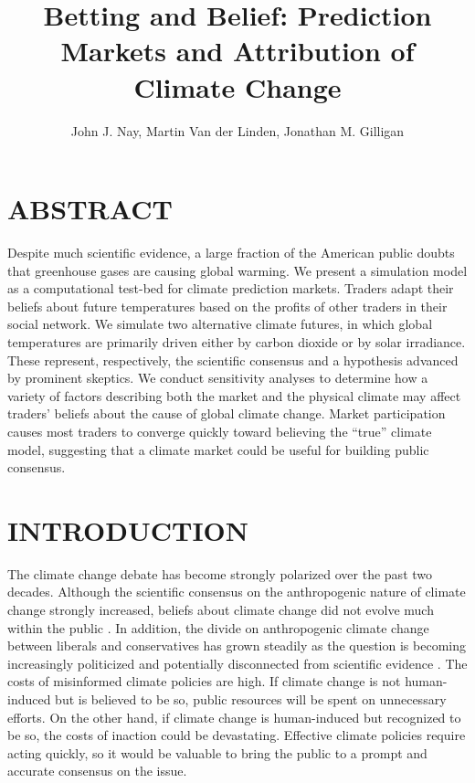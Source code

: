 \documentclass{article}\usepackage[]{graphicx}\usepackage[]{color}
\begin{document}
\title{Betting and Belief: Prediction Markets and Attribution of Climate Change}

\author{John J. Nay, Martin Van der Linden,
Jonathan M. Gilligan
}

\maketitle
\section*{ABSTRACT}

Despite much scientific evidence, a large fraction of the American public doubts that greenhouse gases are causing global warming. We present a simulation model as a computational test-bed for climate prediction markets. Traders adapt their beliefs about future temperatures based on the profits of other traders in their social network. We simulate two alternative climate futures, in which global temperatures are primarily driven either by carbon dioxide or by solar irradiance. These represent, respectively, the scientific consensus and a hypothesis advanced by prominent skeptics. We conduct sensitivity analyses to determine how a variety of factors describing both the market and the physical climate may affect traders' beliefs about the cause of global climate change. Market participation causes most traders to converge quickly toward believing the ``true'' climate model, suggesting that a climate market could be useful for building public consensus.

\section{INTRODUCTION}

The climate change debate has become strongly polarized over the past two decades. Although the scientific consensus on the anthropogenic nature of climate change strongly increased, beliefs about climate change did not evolve much within the public . In addition, the divide on anthropogenic climate change between liberals and conservatives has grown steadily as the question is becoming increasingly politicized and potentially disconnected from scientific evidence . The costs of misinformed climate policies are high. If climate change is not human-induced but is believed to be so, public resources will be spent on unnecessary efforts. On the other hand, if climate change is human-induced but recognized to be so, the costs of inaction could be devastating. Effective climate policies require acting quickly, so it would be valuable to bring the public to a prompt and accurate consensus on the issue.
\end{document}
